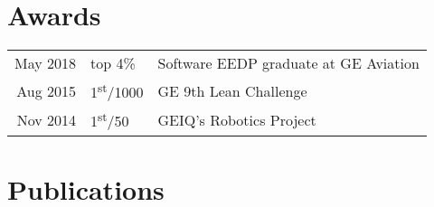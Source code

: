 \documentclass[]{deedy-resume-openfont}
\begin{document}
\begin{minipage}[t]{0.65\textwidth}

\section{Awards} 
\begin{tabular}{rll}
May 2018	& top 4\%                    & Software EEDP graduate at GE Aviation\\
Aug 2015	& 1\textsuperscript{st}/1000 & GE 9th Lean Challenge\\
Nov 2014	& 1\textsuperscript{st}/50   & GEIQ’s Robotics Project\\
\end{tabular}
\sectionsep


\section{Publications} 
\vspace{\topsep} %
\vspace{\topsep} %


\nocite{*}

\end{minipage}

\vfill
\end{document}
